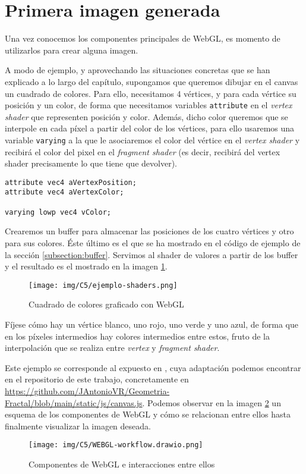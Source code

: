 \section{Primera imagen generada}

Una vez conocemos los componentes principales de WebGL, es momento de utilizarlos para crear alguna imagen.

A modo de ejemplo, y aprovechando las situaciones concretas que se han explicado a lo largo del capítulo, supongamos que queremos dibujar en el canvas un cuadrado de colores. Para ello, necesitamos 4 vértices, y para cada vértice su posición y un color, de forma que necesitamos variables \verb|attribute| en el \textit{vertex shader} que representen posición y color. Además, dicho color queremos que se interpole en cada píxel a partir del color de los vértices, para ello usaremos una variable \verb|varying| a la que le asociaremos el color del vértice en el \textit{vertex shader} y recibirá el color del pixel en el \textit{fragment shader} (es decir, recibirá del vertex shader precisamente lo que tiene que devolver).
\begin{lstlisting}
attribute vec4 aVertexPosition;
attribute vec4 aVertexColor;

varying lowp vec4 vColor;
\end{lstlisting}

Crearemos un buffer para almacenar las posiciones de los cuatro vértices y otro para sus colores. Éste último es el que se ha mostrado en el código de ejemplo de la sección \ref{subsection:buffer}. Servimos al shader de valores a partir de los buffer y el resultado es el mostrado en la imagen \ref{fig:ejemplo-wgl}.

\begin{figure} [ht]
    \centering
    \texttt{[image: img/C5/ejemplo-shaders.png]}
    \caption{Cuadrado de colores graficado con WebGL}
    \label{fig:ejemplo-wgl}
\end{figure}

Fíjese cómo hay un vértice blanco, uno rojo, uno verde y uno azul, de forma que en los píxeles intermedios hay colores intermedios entre estos, fruto de la interpolación que se realiza entre \textit{vertex} y \textit{fragment shader}.

Este ejemplo se corresponde al expuesto en \cite{MDN-1}, cuya adaptación podemos encontrar en el repositorio de este trabajo, concretamente en \url{https://github.com/JAntonioVR/Geometria-Fractal/blob/main/static/js/canvas.js}. Podemos observar en la imagen \ref{fig:componentes-wgl} un esquema de los componentes de WebGL y cómo se relacionan entre ellos hasta finalmente visualizar la imagen deseada.  %

\newpage



\begin{figure} [ht]
    \centering
    \texttt{[image: img/C5/WEBGL-workflow.drawio.png]}
    \caption{Componentes de WebGL e interacciones entre ellos}
    \label{fig:componentes-wgl}
\end{figure}


